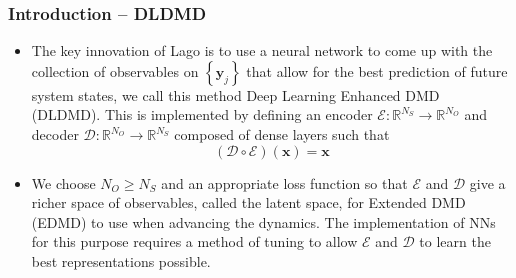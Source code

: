 \documentclass[11pt,aspectratio=169]{beamer}
\newcommand{\norm}[1]{\left|\left|#1\right|\right|}
\newcommand{\parens}[1]{\left(#1\right)}
\newcommand{\bracks}[1]{\left\{#1\right\}}
\newcommand{\R}{\mathbb{R}}
\begin{document}
    \begin{frame}
        \frametitle{Introduction -- DLDMD}
        \begin{itemize}
            \item 
            The key innovation of Lago
            \cite{lago} is to use a neural network to come up with the collection of 
            observables on $\bracks{\boldsymbol{y}_j}$ that allow for the best prediction 
            of future system states, we call this method Deep Learning Enhanced DMD (DLDMD). 
            This is implemented by defining an encoder 
            $\mathcal{E}: \R^{N_S} \to \R^{N_O}$ and decoder $\mathcal{D}: \R^{N_O} \to \R^{N_S}$ composed of 
            dense layers such that 
            \begin{equation}
                (\mathcal{D}\circ\mathcal{E})(\boldsymbol{x}) = \boldsymbol{x}
            \end{equation}
            \item
            We choose $N_O \geq N_S$ and an appropriate loss function so that 
            $\mathcal{E}$ and $\mathcal{D}$ give a richer space of observables, called the 
            latent space, for Extended DMD (EDMD) to use when advancing the dynamics. The implementation 
            of NNs for this purpose requires a method of tuning to allow $\mathcal{E}$ and 
            $\mathcal{D}$ to learn the best representations possible. 
        \end{itemize}
    \end{frame}
    
\end{document}
